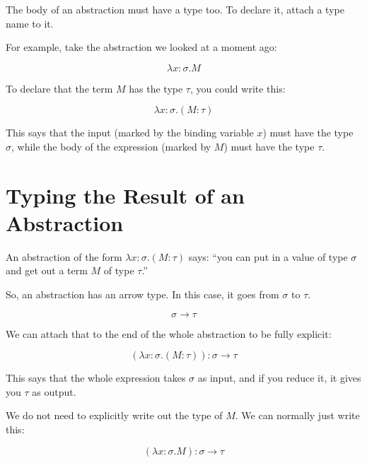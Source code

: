 \documentclass{book}
\numberwithin{equation}{chapter}
\begin{document}
The body of an abstraction must have a type too. To declare it, attach a type name to it.

For example, take the abstraction we looked at a moment ago:

\begin{equation}
\lambda x : \sigma.M
\end{equation} 

\noindent
To declare that the term $M$ has the type $\tau$, you could write this:

\begin{equation}
\lambda x : \sigma.(M : \tau)
\end{equation} 

\noindent
This says that the input (marked by the binding variable $x$) must have the type $\sigma$, while the body of the expression (marked by $M$) must have the type $\tau$.



\section{Typing the Result of an Abstraction}

An abstraction of the form $\lambda x : \sigma.(M : \tau)$ says: ``you can put in a value of type $\sigma$ and get out a term $M$ of type $\tau$.'' 

So, an abstraction has an arrow type. In this case, it goes from $\sigma$ to $\tau$.

\begin{equation}
\sigma \rightarrow \tau
\end{equation}

\noindent
We can attach that to the end of the whole abstraction to be fully explicit:

\begin{equation}
(\lambda x : \sigma.(M : \tau)) : \sigma \rightarrow \tau
\end{equation} 

\noindent
This says that the whole expression takes $\sigma$ as input, and if you reduce it, it gives you $\tau$ as output.

We do not need to explicitly write out the type of $M$. We can normally just write this:

\begin{equation}
(\lambda x : \sigma.M) : \sigma \rightarrow \tau
\end{equation} 
\end{document}
